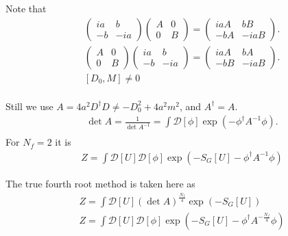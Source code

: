 Note that
\begin{equation}
\begin{split}
&\begin{pmatrix} ia & b \\ -b & -i a\end{pmatrix}\begin{pmatrix} A & 0 \\ 0 & B\end{pmatrix} = \begin{pmatrix} iaA & bB \\ -bA & -i aB\end{pmatrix}.\\
&\begin{pmatrix} A & 0 \\ 0 & B\end{pmatrix}\begin{pmatrix} ia & b \\ -b & -i a\end{pmatrix} = \begin{pmatrix} iaA & bA \\ -bB & -i aB\end{pmatrix}.\\
&[D_{0}, M]\neq 0\\
\end{split}
\end{equation}

Still we use $A=4a^2D^{\dagger}D\neq -D_{0}^2+4a^2m^2$, and $A^{\dagger}=A$.
\begin{equation}
\begin{split}
&\det A = \frac{1}{ \det A^{-1} }=\int \mathcal{D}[\phi] \exp (-\phi^{\dagger} A^{-1} \phi).\\
\end{split}
\end{equation}
For $N_f=2$ it is
\begin{equation}
\begin{split}
&Z=\int \mathcal{D}[U]  \mathcal {D}[\phi]\exp \left(-S_G[U]-\phi ^{\dagger} A^{-1} \phi \right)
\end{split}
\end{equation}

The true fourth root method is taken here as
\begin{equation}
\begin{split}
&Z=\int \mathcal{D}[U] \left(\det A \right)^{\frac{N_f}{4}}\exp \left(-S_G[U]\right)\\
&Z=\int \mathcal{D}[U]  \mathcal {D}[\phi]\exp \left(-S_G[U]-\phi ^{\dagger} A^{-\frac{N_f}{4}} \phi \right)\\
\end{split}
\end{equation}

